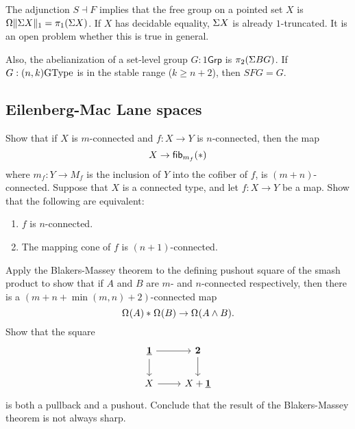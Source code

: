 The adjunction ${S} \dashv {F}$ implies that the free group on a
pointed set $X$ is $\loopspacesym\trunc{1}{\susp X}=\pi_1(\susp X)$.  If $X$
has decidable equality, $\susp X$ is already $1$-truncated. It is an
open problem whether this is true in general.

Also, the abelianization of a set-level group $G : 1\mathsf{Grp}$ is
$\pi_2(\susp BG)$. If $G : (n,k)\GType$ is in the stable range ($k \ge
n+2$), then $SFG=G$.

\subsection{Eilenberg-Mac Lane spaces}

\begin{exercises}
\exercise Show that if $X$ is $m$-connected and $f:X\to Y$ is $n$-connected, then the map
\begin{equation*}
X \to \fib{m_f}{\ast}
\end{equation*}
where $m_f:Y\to M_f$ is the inclusion of $Y$ into the cofiber of $f$, is $(m+n)$-connected.
\exercise Suppose that $X$ is a connected type, and let $f:X\to Y$ be a map.
Show that the following are equivalent:
\begin{enumerate}
\item $f$ is $n$-connected.
\item The mapping cone of $f$ is $(n+1)$-connected.
\end{enumerate}
\exercise Apply the Blakers-Massey theorem to the defining pushout square of the smash product to show that if $A$ and $B$ are $m$- and $n$-connected respectively, then there is a $(m+n+\min(m,n)+2)$-connected map
\begin{equation*}
\join{\loopspace{A}}{\loopspace{B}}\to \loopspace{A \wedge B}.
\end{equation*}
\exercise Show that the square
\begin{equation*}
\begin{tikzcd}
\unit \arrow[r] \arrow[d] & \bool \arrow[d] \\
X \arrow[r] & X+\unit
\end{tikzcd}
\end{equation*}
is both a pullback and a pushout. Conclude that the result of the Blakers-Massey theorem is not always sharp.
\end{exercises}
